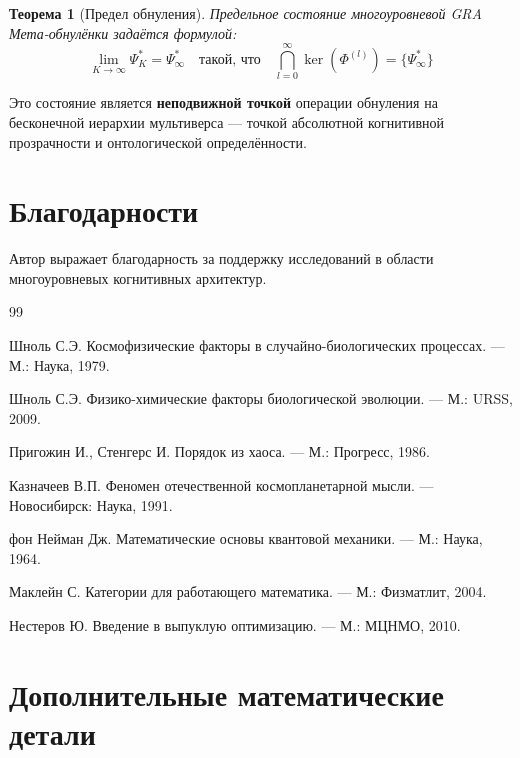 \documentclass[12pt,a4paper]{article}
\newtheorem{theorem}{Теорема}[section]
\newcommand{\PhiFunc}{\Phi}
\begin{document}
\begin{theorem}[Предел обнуления]
Предельное состояние многоуровневой GRA Мета-обнулёнки задаётся формулой:
\begin{equation}
\boxed{
\lim_{K \to \infty} \Psi_K^* = \Psi_{\infty}^* \quad \text{такой, что} \quad 
\bigcap_{l=0}^{\infty} \ker(\PhiFunc^{(l)}) = \{\Psi_{\infty}^*\}
}
\end{equation}
\end{theorem}

Это состояние является \textbf{неподвижной точкой} операции обнуления на бесконечной иерархии мультиверса --- точкой абсолютной когнитивной прозрачности и онтологической определённости.

\section*{Благодарности}

Автор выражает благодарность за поддержку исследований в области многоуровневых когнитивных архитектур.

\begin{thebibliography}{99}

Шноль С.Э. Космофизические факторы в случайно-биологических процессах. --- М.: Наука, 1979.

Шноль С.Э. Физико-химические факторы биологической эволюции. --- М.: URSS, 2009.

Пригожин И., Стенгерс И. Порядок из хаоса. --- М.: Прогресс, 1986.

Казначеев В.П. Феномен отечественной космопланетарной мысли. --- Новосибирск: Наука, 1991.

фон Нейман Дж. Математические основы квантовой механики. --- М.: Наука, 1964.

Маклейн С. Категории для работающего математика. --- М.: Физматлит, 2004.

Нестеров Ю. Введение в выпуклую оптимизацию. --- М.: МЦНМО, 2010.

\end{thebibliography}

\appendix

\section{Дополнительные математические детали}
\end{document}
